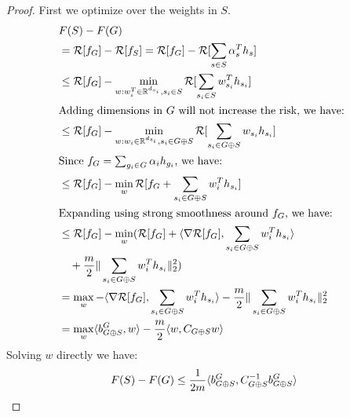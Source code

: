 \begin{proof}
First we optimize over the weights in $S$. 
  \begin{align*}
    &{} F(S) - F(G) \\
    &= \mathcal{R}[f_G] - \mathcal{R}[f_S] 
     = \mathcal{R}[f_G] - \mathcal{R}[\sum _{s \in S} \alpha_s^T h_s] \\
    &\leq \mathcal{R}[f_G] - \min _{w : w_i^T \in \mathbb{R}^{d_{s_i}}, s_i \in S} 
        \mathcal{R}[ \sum _{s_i \in S} w_{s_i}^T h_{s_i}] \\
\intertext{Adding dimensions in $G$ will not increase the risk, we have: }
    &\leq \mathcal{R}[f_G] - \min _{w : w_i \in \mathbb{R}^{d_{s_i}}, s_i \in G \oplus S}
        \mathcal{R}[ \sum _{s_i \in G \oplus S} w_{s_i} h_{s_i}] \\
\intertext{Since $f_G = \sum _{g_i \in G} \alpha_i h_{g_i}$, we have:}
    &\leq \mathcal{R}[f_G] - \min _{w} 
      \mathcal{R}[f_G + \sum _{s_i \in G \oplus S} w_i^T h_{s_i}] \\
\intertext{Expanding using strong smoothness around $f_G$, we have:}
    &\leq \mathcal{R}[f_G] - \min _{w} (
      \mathcal{R}[f_G] + \langle  \nabla \mathcal{R}[f_G], 
        \sum _{s_i \in G\oplus S} w_i^T h_{s_i}  \rangle \notag \\
    &\quad + \frac{m}{2} \Vert \sum _{s_i \in G \oplus S} w_i^T h_{s_i} \Vert _2^2) \\
    &= \max_{w} - 
      \langle  \nabla \mathcal{R}[f_G], 
      \sum _{s_i \in G\oplus S} w_i^T h_{s_i}  \rangle 
        - \frac{m}{2} \Vert \sum _{s_i \in G \oplus S} w_i^T h_{s_i} \Vert _2^2 \\
    &= \max_w \langle  b^{G}_{G\oplus S}, w \rangle - \frac{m}{2} \langle w, C_{G\oplus S}w \rangle
 \end{align*}
Solving $w$ directly we have:
\begin{align*}
  F(S) - F(G) \leq \frac{1}{2m} \langle  b^{G}_{G\oplus S} , C_{G\oplus S}^{-1} b^{G}_{G\oplus S} \rangle
\end{align*}
\end{proof}


